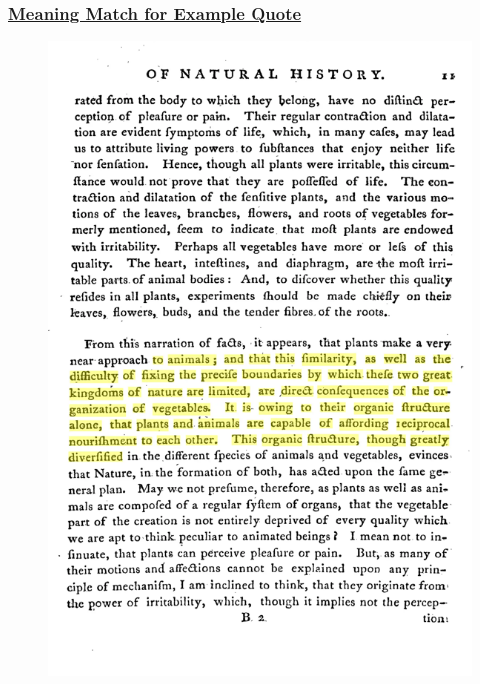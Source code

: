 \documentclass[pdf]{beamer}
\begin{document}
\begin{frame}
  \frametitle{\href{https://gallica-kaiku.rahtiapp.fi/?eccoId=1168600400&offsetStart=28429&offsetEnd=28832}{Meaning Match for Example Quote}}
    \begin{figure}[htbp]
      \centering
      \includegraphics[width=\linewidth,height=\textheight,keepaspectratio]{images/meaning_match.png}
    \end{figure}
\end{frame}
\end{document}
